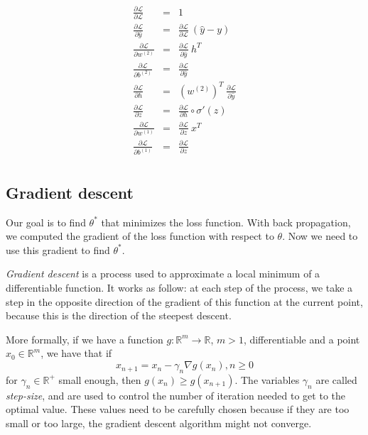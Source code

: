 \documentclass[10pt,a4paper]{article}
\theoremstyle{definition}
\theoremstyle{plain}
\begin{document}
\begin{eqnarray*}
\frac{\partial \mathcal{L}}{\partial \mathcal{L}} & = & 1 \\
\frac{\partial \mathcal{L}}{\partial \hat{y}} & = & \frac{\partial \mathcal{L}}{\partial \mathcal{L}} \ (\hat{y} - y) \\
\frac{\partial \mathcal{L}}{\partial w^{(2)}} & = & \frac{\partial \mathcal{L}}{\partial \hat{y}}\ h^T \\
\frac{\partial \mathcal{L}}{\partial b^{(2)}} & = & \frac{\partial \mathcal{L}}{\partial \hat{y}} \\
\frac{\partial \mathcal{L}}{\partial h} & = &  (w^{(2)})^T\ \frac{\partial \mathcal{L}}{\partial \hat{y}} \\
\frac{\partial \mathcal{L}}{\partial z} & = & \frac{\partial \mathcal{L}}{\partial h} \circ \sigma '(z) \\
\frac{\partial \mathcal{L}}{\partial w^{(1)}} & = & \frac{\partial \mathcal{L}}{\partial z}\ x^T \\
\frac{\partial \mathcal{L}}{\partial b^{(1)}} & = & \frac{\partial \mathcal{L}}{\partial z} \\
\end{eqnarray*}

\subsection{Gradient descent}

Our goal is to find $\theta^*$ that minimizes the loss function. With back propagation, we computed the gradient of the loss function with respect to $\theta$. Now we need to use this gradient to find $\theta^*$. 

\textit{Gradient descent} \cite{1} is a process used to approximate a local minimum of a differentiable function. It works as follow: at each step of the process, we take a step in the opposite direction of the gradient of this function at the current point, because this is the direction of the steepest descent.

More formally, if we have a function $g: \mathbb{R}^m \rightarrow \mathbb{R}$, $m>1$, differentiable and a point $x_0\in \mathbb{R}^m$, we have that if
$$
x_{n+1} = x_n -\gamma_n \nabla g(x_n), n\geq 0
$$
for $\gamma_n \in \mathbb{R}^+$ small enough, then $g(x_n) \geq g(x_{n+1})$. The variables $\gamma_n$ are called \textit{step-size}, and are used to control the number of iteration needed to get to the optimal value. These values need to be carefully chosen because if they are too small or too large, the gradient descent algorithm might not converge.
\end{document}
